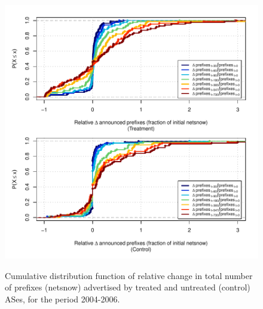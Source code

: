 \clearpage
\vspace*{1.25em}
\begin{figure}[H]
\begin{centering}
\begin{singlespace}
\captionsetup{list=no}
    \includegraphics[width=6in]{figures/behavior-rel_netsnow-2004_2006-corr.pdf}
    \vspace{-2em}\\
    \caption{Cumulative distribution function of relative change in total
    number of prefixes (netsnow) advertised by treated and untreated (control)
    ASes, for the period 2004-2006.}
\end{singlespace}
\end{centering}
\end{figure}

